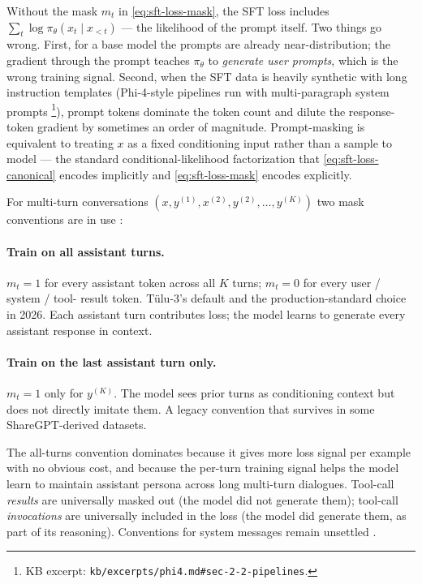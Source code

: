 Without the mask $m_t$ in \cref{eq:sft-loss-mask}, the SFT loss
includes $\sum_t \log \pi_\theta(x_t \mid x_{<t})$ — the likelihood of
the prompt itself. Two things go wrong. First, for a base model the
prompts are already near-distribution; the gradient through the prompt
teaches $\pi_\theta$ to \emph{generate user prompts}, which is the wrong
training signal. Second, when the SFT data is heavily synthetic with
long instruction templates (Phi-4-style pipelines run with
multi-paragraph system prompts \citep[\S 2.2]{phi4}\footnote{KB excerpt:
\nolinkurl{kb/excerpts/phi4.md#sec-2-2-pipelines}.}), prompt tokens
dominate the token count and dilute the response-token gradient by
sometimes an order of magnitude. Prompt-masking is equivalent to
treating $x$ as a fixed conditioning input rather than a sample to
model — the standard conditional-likelihood factorization that
\cref{eq:sft-loss-canonical} encodes implicitly and
\cref{eq:sft-loss-mask} encodes explicitly.

For multi-turn conversations $(x, y^{(1)}, x^{(2)}, y^{(2)}, \ldots,
y^{(K)})$ two mask conventions are in use \citep{tulu3}:

\paragraph{Train on all assistant turns.} $m_t = 1$ for every assistant
token across all $K$ turns; $m_t = 0$ for every user / system / tool-
result token. T\"ulu-3's default and the production-standard choice in
2026. Each assistant turn contributes loss; the model learns to
generate every assistant response in context.

\paragraph{Train on the last assistant turn only.} $m_t = 1$ only for
$y^{(K)}$. The model sees prior turns as conditioning context but does
not directly imitate them. A legacy convention that survives in some
ShareGPT-derived datasets.

The all-turns convention dominates because it gives more loss signal
per example with no obvious cost, and because the per-turn training
signal helps the model learn to maintain assistant persona across long
multi-turn dialogues. Tool-call \emph{results} are universally masked
out (the model did not generate them); tool-call \emph{invocations}
are universally included in the loss (the model did generate them, as
part of its reasoning). Conventions for system messages remain
unsettled .

